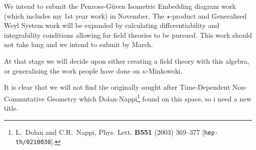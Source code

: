 \documentclass[a4,12pt,titlepage]{seminar}
\begin{document}
We intend to submit the Penrose-G\"{u}ven Isometric Embedding diagram work
(which includes my 1st year work) in November. The $\star$-product and
Generalised Weyl System work will be expanded by calculating differentiability
and integrability conditions allowing for field theories to be pursued. This
work should not take long and we intend to submit by March.

At that stage we will decide upon either creating a field theory with this
algebra, or generalising the work people have done on $\kappa$-Minkowski.

It is clear that we will not find the originally sought after Time-Dependent
Non-Commutative Geometry which Dolan-Nappi\footnote{L.~Dolan and C.R.~Nappi,
  Phys. Lett. {\bf B551} (2003) 369--377 [{\tt hep-th/0210030}].} found on this
space, so i need a new title.
\end{document}
